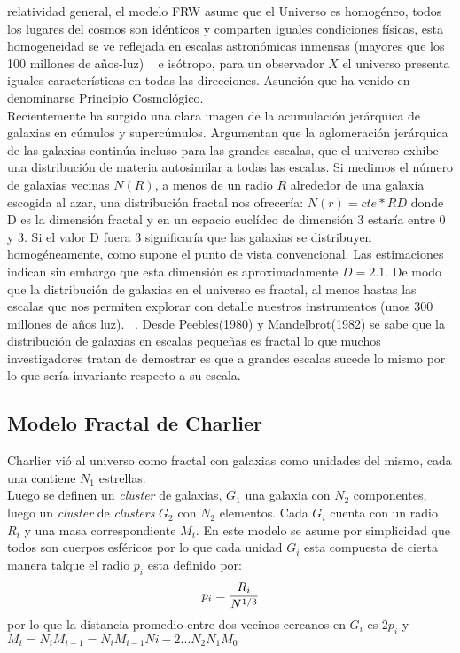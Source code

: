 \documentclass[12tp]{article}
\begin{document}
relatividad general, el modelo FRW asume que el Universo es homogéneo, todos los lugares del cosmos son idénticos y comparten iguales 
condiciones físicas, esta homogeneidad se ve reflejada en escalas astronómicas inmensas (mayores que los 100 millones de años-luz) ~\cite{Gangui2009}
e isótropo, para un observador $X$ el universo presenta iguales características en todas las direcciones. 
Asunción que ha venido en denominarse Principio Cosmológico.~\cite{fractals}\\[0.2cm]
Recientemente ha surgido una clara imagen de la acumulación jerárquica de galaxias en cúmulos y supercúmulos.
Argumentan que la aglomeración jerárquica de las galaxias continúa incluso para las grandes escalas, que el universo 
exhibe una distribución de materia autosimilar a todas las escalas. Si medimos el número de galaxias vecinas $N(R)$, a menos de un radio $R$ 
alrededor de una galaxia escogida al azar, una distribución fractal nos ofrecería:
$N(r) = cte * RD$
donde D es la dimensión fractal y en un espacio euclídeo de dimensión 3 estaría entre 0 y 3. Si el valor D fuera 3 significaría que las 
galaxias se distribuyen homogéneamente, como supone el punto de vista convencional. Las estimaciones indican sin embargo que esta 
dimensión es aproximadamente $D = 2.1$. De modo que la distribución de galaxias en el universo es fractal, al menos hastas las escalas que 
nos permiten explorar con detalle nuestros instrumentos (unos 300 millones de años luz). ~\cite{fractals}. Desde Peebles(1980) y Mandelbrot(1982) se sabe que la distribución de galaxias en escalas pequeñas es fractal lo que muchos investigadores tratan de 
demostrar es que a grandes escalas sucede lo mismo por lo que sería invariante respecto a su escala.

\subsection{Modelo Fractal de Charlier}
Charlier vió al universo como fractal con galaxias como unidades del mismo, cada una contiene $N_1$ estrellas.\\
Luego se definen un \emph{cluster} de galaxias, $G_1$ una galaxia con $N_2$ componentes, luego un \emph{cluster} de \emph{clusters}
$G_2$ con $N_2$ elementos. Cada $G_i$ cuenta con un radio $R_i$ y una masa correspondiente $M_i$.
En este modelo se asume por simplicidad que todos son cuerpos esféricos por lo que cada unidad $G_i$ esta compuesta de
cierta manera talque el radio $p_i$ esta definido por:
\begin{equation}
    p_i= {{R_i }\over{N^{1/3}}}
\end{equation}
por lo que la distancia promedio entre dos vecinos cercanos en $G_i$ es $2p_i$ y $M_i=N_iM_{i-1}= N_iM_{i-1}N{i-2}...N_2N_1M_0$
\end{document}
